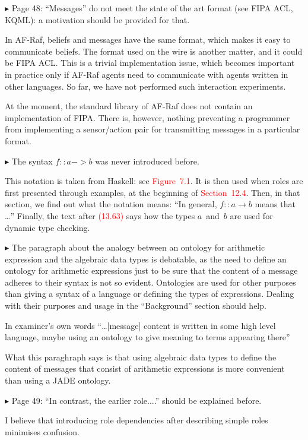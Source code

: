 \documentclass{article}
\newcommand*\R[1]{\textcolor{red}{#1}} %
\newenvironment{them}%
  {\bigskip\noindent\begingroup\color{blue}$\blacktriangleright$\enspace}%
  {\endgroup\par}
\begin{document}
\begin{them}
Page 48:
``Messages'' do not meet the state of the art format (see FIPA ACL, KQML): a
motivation should be provided for that.
\end{them}

In AF-Raf,
  beliefs and messages have the same format,
  which makes it easy to communicate beliefs.
The format used on the wire is another matter,
  and it could be FIPA ACL\null.
This is a trivial implementation issue,
  which becomes important in practice only if AF-Raf agents
  need to communicate with agents written in other languages.
So far, we have not performed such interaction experiments.

At the moment,
  the standard library of AF-Raf does not contain an implementation of FIPA\null.
There is, however,
  nothing preventing a programmer from implementing a sensor/action pair
  for transmitting messages in a particular format.


\begin{them}
The syntax $f::a->b$ was never introduced before.
\end{them}
This notation is taken from Haskell: see \R{Figure~7.1}.
It is then used when roles are first presented through examples,
  at the beginning of \R{Section~12.4}.
Then, in that section, we find out what the notation means:
``In general, $f::a\to b$ means that \dots''
Finally,
  the text after \R{(13.63)} says how the types $a$~and~$b$
  are used for dynamic type checking.


\begin{them}
The paragraph about the analogy between an ontology for arithmetic expression
and the algebraic data types is debatable, as the need to define an ontology
for arithmetic expressions just to be sure that the content of a message
adheres to their syntax is not so evident. Ontologies are used for other
purposes than giving a syntax of a language or defining the types of
expressions. Dealing with their purposes and usage in the ``Background'' section
should help.
\end{them}
In examiner's own words ``\ldots [message] content is written in some high
level language, maybe using an ontology to give meaning to terms appearing
there''

What this paraghraph says is that using algebraic data types to define the
content of messages that consist of arithmetic expressions is more convenient
than using a JADE ontology.

\begin{them}
Page 49:
``In contrast, the earlier role....'' should be explained before.
\end{them}
I believe that introducing role dependencies after describing simple roles
minimises confusion.
\end{document}
